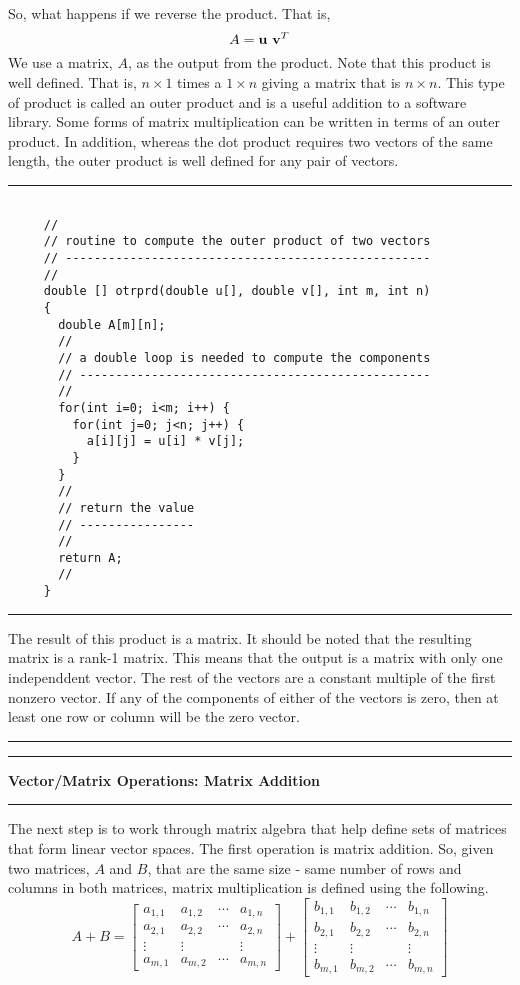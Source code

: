 \documentclass[10pt,fleqn]{article}
\begin{document}
So, what happens if we reverse the product. That is,
$$
   A = {\bf u}\ {\bf v}^T 
$$
We use a matrix, $A$, as the output from the product. Note that this product is
well defined. That is, $n\times 1$ times a $1\times n$ giving a matrix that is
$n\times n$. This type of product is called an outer product and is a useful
addition to a software library. Some forms of matrix multiplication can be
written in terms of an outer product. In addition, whereas the dot product
requires two vectors of the same length, the outer product is well defined for
any pair of vectors.
\vskip0.1in\hrule\vskip0.1in
\begin{verbatim}

     //
     // routine to compute the outer product of two vectors
     // ---------------------------------------------------
     //
     double [] otrprd(double u[], double v[], int m, int n)
     {
       double A[m][n];
       //
       // a double loop is needed to compute the components
       // -------------------------------------------------
       //
       for(int i=0; i<m; i++) {
         for(int j=0; j<n; j++) {
           a[i][j] = u[i] * v[j];
         }
       }
       //
       // return the value
       // ----------------
       //
       return A;
       //
     }

\end{verbatim}
\vskip0.1in\hrule\vskip0.1in
The result of this product is a matrix. It should be noted that the resulting
matrix is a rank-1 matrix. This means that the output is a matrix with only
one independdent vector. The rest of the vectors are a constant multiple of
the first nonzero vector. If any of the components of either of the vectors is
zero, then at least one row or column will be the zero vector.
\vskip0.1in\hrule\vskip0.1in
\newpage
\vskip0.1in\hrule\vskip0.1in
\noindent
{\bf Vector/Matrix Operations: Matrix Addition}
\vskip0.1in\hrule\vskip0.1in
\noindent
The next step is to work through matrix algebra that help define sets of
matrices that form linear vector spaces. The first operation is matrix
addition. So, given two matrices, $A$ and $B$, that are the same size - same
number of rows and columns in both matrices, matrix multiplication is defined
using the following. 
$$
  A + B =
   \left[
     \begin{array}{cccc}
       a_{1,1} & a_{1,2} & \cdots & a_{1,n} \\
       a_{2,1} & a_{2,2} & \cdots & a_{2,n} \\
       \vdots  & \vdots  &  \    & \vdots  \\
       a_{m,1} & a_{m,2} & \cdots & a_{m,n}
     \end{array}
   \right] 
 + \left[
     \begin{array}{cccc}
       b_{1,1} & b_{1,2} & \cdots & b_{1,n} \\
       b_{2,1} & b_{2,2} & \cdots & b_{2,n} \\
       \vdots  & \vdots  &  \    & \vdots  \\
       b_{m,1} & b_{m,2} & \cdots & b_{m,n}
     \end{array}
   \right] 
$$
\end{document}
